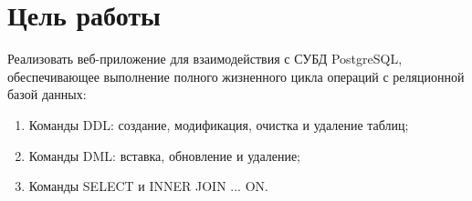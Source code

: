 \chapter{Цель работы}
\label{cha:aim}

Реализовать веб-приложение для взаимодействия с СУБД PostgreSQL, обеспечивающее выполнение полного жизненного цикла операций с реляционной базой данных:
\begin{enumerate}
    \item Команды DDL: создание, модификация, очистка и удаление таблиц;
    \item Команды DML: вставка, обновление и удаление;
    \item Команды SELECT и INNER JOIN ... ON.
\end{enumerate}
